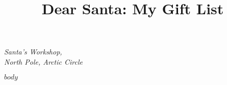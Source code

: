 \documentclass{article}
\begin{document}
\title{Dear Santa: My Gift List}
\date{}
\maketitle
\thispagestyle{empty}

\begin{center}
  \textit{Santa's Workshop,\\
  North Pole, Arctic Circle}
\end{center}

$body$
\end{document}
